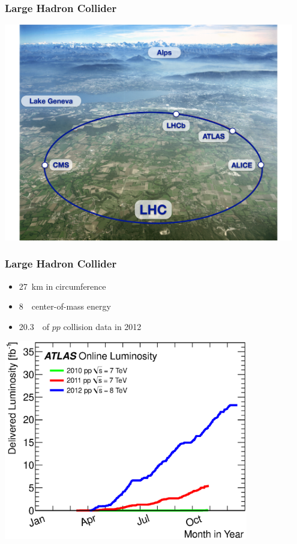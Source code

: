 \documentclass[10pt, svgnames]{beamer}
\begin{document}
\begin{frame}
  \frametitle{Large Hadron Collider}
  \begin{center}
    \includegraphics[width=0.95\textwidth]
    {figures/lhc_and_atlas/lhc_aerial.pdf}
  \end{center}
\end{frame}

\begin{frame}
  \frametitle{Large Hadron Collider}
  \begin{itemize}
    \item 27~km in circumference
    \item 8~\TeV\ center-of-mass energy
    \item 20.3~\ifb\ of $pp$ collision data in 2012
  \end{itemize}
  \begin{center}
    \includegraphics[width=0.8\textwidth]
    {figures/lhc_and_atlas/intlumivsyear.eps}
  \end{center}
\end{frame}
\end{document}
